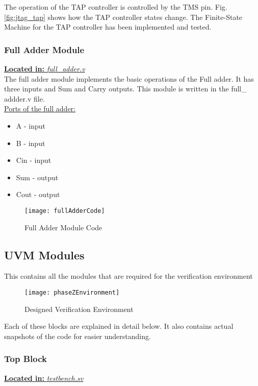 \documentclass[a4paper,11pt]{article}
\begin{document}
The operation of the TAP controller is controlled by the TMS pin. Fig. \ref{fig:jtag_tap} shows how the TAP controller states change. The Finite-State Machine for the TAP controller has been implemented and tested.


\FloatBarrier
\subsubsection{Full Adder Module}
\underline{\textbf{Located in:} \textit{full\_adder.v}}\\

The full adder module implements the basic operations of the Full adder. It has three inputs and Sum and Carry outputs. This module is written in the full\_ addder.v file.\\

\underline{Ports of the full adder:}
\begin{itemize}[noitemsep]
\item A - input
\item B - input
\item Cin - input
\item Sum - output
\item Cout - output
\end{itemize}

\begin{figure}[ht]
\centering
\texttt{[image: fullAdderCode]}
\caption{Full Adder Module Code}
\label{fig: Full Adder Code}
\end{figure}

\FloatBarrier
\subsection{UVM Modules}
This contains all the modules that are required for the verification environment
\begin{figure}[ht]
\centering
\texttt{[image: phaseZEnvironment]}
\caption{Designed Verification Environment}
\label{fig: Designed Verification Environment}
\end{figure}

Each of these blocks are explained in detail below. It also contains actual snapshots of the code for easier understanding.

\FloatBarrier
\subsubsection{Top Block}
\underline{\textbf{Located in:} \textit{testbench.sv}}\\
\end{document}
